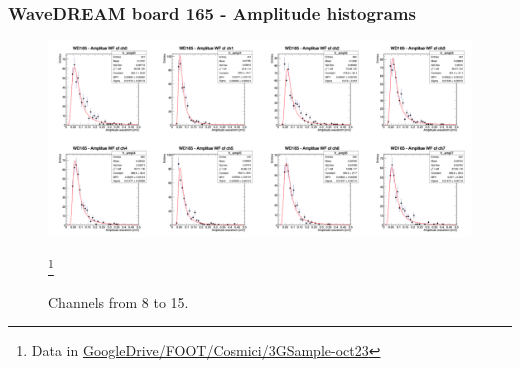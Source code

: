 \begin{frame} [fragile]
    \small
        \frametitle{WaveDREAM board 165 - Amplitude histograms}
                \begin{figure}
             \centering
                \includegraphics[scale=0.28]{figures/hist_ampl_2.png}
                \caption{Channels from 8 to 15.} \footnote{Data in \href{https://drive.google.com/drive/u/1/folders/16qDMMqx-QTr3lPnTk-1lWUYrBUTcSdOi}{GoogleDrive/FOOT/Cosmici/3GSample-oct23}}
            \end{figure}
    \end{frame}
